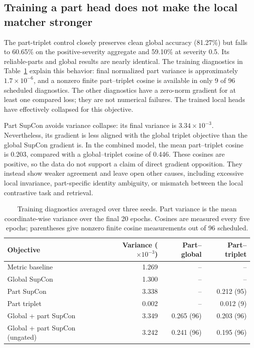 \documentclass[runningheads]{llncs}
\begin{document}
\subsection{Training a part head does not make the local matcher stronger}

The part-triplet control closely preserves clean global accuracy (81.27\%) but
falls to 60.65\% on the positive-severity aggregate and 59.10\% at severity 0.5.
Its reliable-parts and global results are nearly identical. The training
diagnostics in Table~\ref{tab:mechanisms} explain this behavior: final normalized
part variance is approximately $1.7\times10^{-6}$, and a nonzero finite
part--triplet cosine is available in only 9 of 96 scheduled diagnostics. The
other diagnostics have a zero-norm gradient for at least one compared loss;
they are not numerical failures. The trained local heads have effectively
collapsed for this objective.

Part SupCon avoids variance collapse: its final variance is
$3.34\times10^{-3}$. Nevertheless, its gradient is less aligned with the
global triplet objective than the global SupCon gradient is. In the combined
model, the mean part--triplet cosine is 0.203, compared with a global--triplet
cosine of 0.446. These cosines are positive, so the data do not support a claim
of direct gradient opposition. They instead show weaker agreement and leave
open other causes, including excessive local invariance, part-specific identity
ambiguity, or mismatch between the local contrastive task and retrieval.

\begin{table}[t]
\centering
\caption{Training diagnostics averaged over three seeds. Part variance is the
mean coordinate-wise variance over the final 20 epochs. Cosines are measured
every five epochs; parentheses give nonzero finite cosine measurements out of
96 scheduled.}
\label{tab:mechanisms}
\small
\setlength{\tabcolsep}{4pt}
\begin{tabular}{@{}lrrr@{}}
\toprule
Objective & Variance ($\times10^{-3}$) & Part--global & Part--triplet \\
\midrule
Metric baseline & 1.269 & -- & -- \\
Global SupCon & 1.300 & -- & -- \\
Part SupCon & 3.338 & -- & 0.212 (95) \\
Part triplet & 0.002 & -- & 0.012 (9) \\
Global + part SupCon & 3.349 & 0.265 (96) & 0.203 (96) \\
Global + part SupCon (ungated) & 3.242 & 0.241 (96) & 0.195 (96) \\
\bottomrule
\end{tabular}
\end{table}
\end{document}
